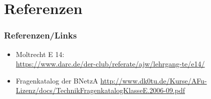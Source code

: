 \section*{Referenzen}
\begin{frame}
  \frametitle{Referenzen/Links}

  \footnotesize
  \begin{itemize}
    \item Moltrecht E 14: \\
      \url{https://www.darc.de/der-club/referate/ajw/lehrgang-te/e14/}
    \item Fragenkatalog der BNetzA
      \url{http://www.dk0tu.de/Kurse/AFu-Lizenz/docs/TechnikFragenkatalogKlasseE.2006-09.pdf}
  \end{itemize}

\end{frame}



